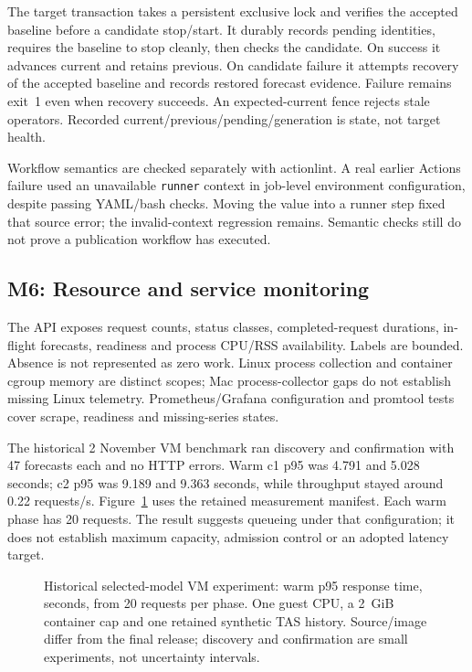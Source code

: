 \documentclass[a4paper,11pt]{article}
\begin{document}
The target transaction takes a persistent exclusive lock and verifies the accepted
baseline before a candidate stop/start. It durably records pending identities,
requires the baseline to stop cleanly, then checks the candidate. On success it
advances current and retains previous. On candidate failure it attempts recovery
of the accepted baseline and records restored forecast evidence. Failure remains
exit~1 even when recovery succeeds. An expected-current fence rejects stale
operators. Recorded current/previous/pending/generation is state, not target health.

Workflow semantics are checked separately with actionlint. A real earlier Actions
failure used an unavailable \texttt{runner} context in job-level environment
configuration, despite passing YAML/bash checks. Moving the value into a runner
step fixed that source error; the invalid-context regression remains. Semantic
checks still do not prove a publication workflow has executed.

\subsection{M6: Resource and service monitoring}

The API exposes request counts, status classes, completed-request durations,
in-flight forecasts, readiness and process CPU/RSS availability. Labels are
bounded. Absence is not represented as zero work. Linux process collection and
container cgroup memory are distinct scopes; Mac process-collector gaps do not
establish missing Linux telemetry. Prometheus/Grafana configuration and promtool
tests cover scrape, readiness and missing-series states.

The historical 2 November VM benchmark ran discovery and confirmation with
47 forecasts each and no HTTP errors. Warm c1 p95 was 4.791 and 5.028 seconds;
c2 p95 was 9.189 and 9.363 seconds, while throughput stayed around 0.22 requests/s.
Figure~\ref{fig:latency} uses the retained measurement manifest. Each warm phase
has 20 requests. The result suggests queueing under that configuration; it does
not establish maximum capacity, admission control or an adopted latency target.

\begin{figure}[ht]\centering

\caption{Historical selected-model VM experiment: warm p95 response time, seconds,
from 20 requests per phase. One guest CPU, a 2~GiB container cap and one retained
synthetic TAS history. Source/image differ from the final release; discovery and
confirmation are small experiments, not uncertainty intervals.}\label{fig:latency}
\end{figure}
\end{document}
